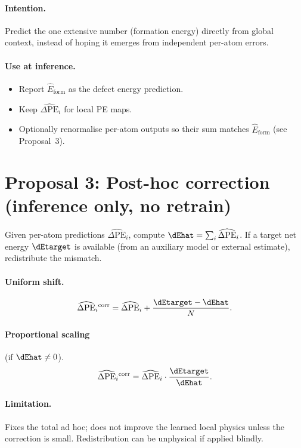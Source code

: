 \documentclass[11pt,a4paper]{article}
\newcommand{\dPEhat}{\widehat{\Delta\mathrm{PE}}}
\begin{document}
\paragraph{Intention.} Predict the one extensive number (formation energy) directly from global context, instead of hoping it emerges from independent per-atom errors.

\paragraph{Use at inference.}
\begin{itemize}
  \item Report $\widehat{E}_{\mathrm{form}}$ as the defect energy prediction.
  \item Keep $\dPEhat_i$ for local PE maps.
  \item Optionally renormalise per-atom outputs so their sum matches $\widehat{E}_{\mathrm{form}}$ (see Proposal~3).
\end{itemize}

\section*{Proposal 3: Post-hoc correction (inference only, no retrain)}

Given per-atom predictions $\dPEhat_i$, compute $\dEhat=\sum_i\dPEhat_i$. If a target net energy $\dEtarget$ is available (from an auxiliary model or external estimate), redistribute the mismatch.

\paragraph{Uniform shift.}
\begin{equation}
  \dPEhat_i{}^{\mathrm{corr}}
  = \dPEhat_i+\frac{\dEtarget-\dEhat}{N}.
\end{equation}

\paragraph{Proportional scaling} (if $\dEhat\neq 0$).
\begin{equation}
  \dPEhat_i{}^{\mathrm{corr}}
  = \dPEhat_i\cdot\frac{\dEtarget}{\dEhat}.
\end{equation}

\paragraph{Limitation.} Fixes the total ad hoc; does not improve the learned local physics unless the correction is small. Redistribution can be unphysical if applied blindly.
\end{document}
